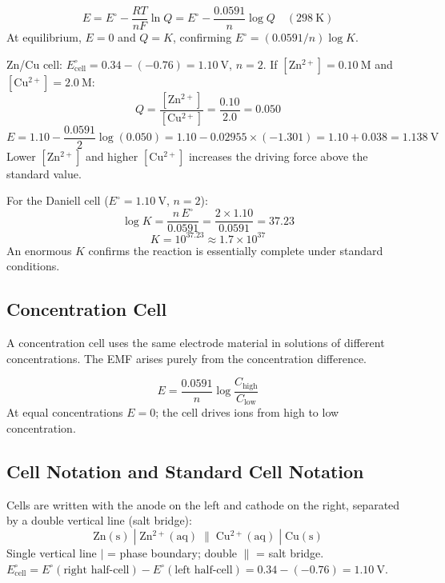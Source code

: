 \documentclass[12pt,a4paper]{article}
\begin{document}
\begin{tcolorbox}[formulabox, title={Nernst Equation}]
\[
E = E^\circ - \frac{RT}{nF}\ln Q = E^\circ - \frac{0.0591}{n}\log Q \quad (298\ \mathrm{K})
\]
At equilibrium, $E = 0$ and $Q = K$, confirming $E^\circ = (0.0591/n)\log K$.
\end{tcolorbox}

\begin{tcolorbox}[examplebox, title={Solved Example: Daniell Cell EMF via Nernst}]
Zn/Cu cell: $E^\circ_{\mathrm{cell}} = 0.34 - (-0.76) = 1.10\ \mathrm{V}$, $n=2$.
If $[\mathrm{Zn^{2+}}] = 0.10\ \mathrm{M}$ and $[\mathrm{Cu^{2+}}] = 2.0\ \mathrm{M}$:
\[
Q = \frac{[\mathrm{Zn^{2+}}]}{[\mathrm{Cu^{2+}}]} = \frac{0.10}{2.0} = 0.050
\]
\[
E = 1.10 - \frac{0.0591}{2}\log(0.050) = 1.10 - 0.02955\times(-1.301) = 1.10 + 0.038 = 1.138\ \mathrm{V}
\]
Lower $[\mathrm{Zn^{2+}}]$ and higher $[\mathrm{Cu^{2+}}]$ increases the driving force above the standard value.
\end{tcolorbox}

\begin{tcolorbox}[examplebox, title={Solved Example: Equilibrium Constant from \texorpdfstring{$E^\circ$}{E0}}]
For the Daniell cell ($E^\circ = 1.10\ \mathrm{V}$, $n=2$):
\[
\log K = \frac{n\,E^\circ}{0.0591} = \frac{2\times1.10}{0.0591} = 37.23
\]
\[
K = 10^{37.23} \approx 1.7\times10^{37}
\]
An enormous $K$ confirms the reaction is essentially complete under standard conditions.
\end{tcolorbox}

\subsection{Concentration Cell}
A concentration cell uses the same electrode material in solutions of different concentrations. The EMF arises purely from the concentration difference.

\begin{tcolorbox}[formulabox, title={Concentration Cell EMF}]
\[
E = \frac{0.0591}{n}\log\frac{C_{\mathrm{high}}}{C_{\mathrm{low}}}
\]
At equal concentrations $E = 0$; the cell drives ions from high to low concentration.
\end{tcolorbox}

\subsection{Cell Notation and Standard Cell Notation}
Cells are written with the anode on the left and cathode on the right, separated by a double vertical line (salt bridge):
\[
\mathrm{Zn(s)}\;|\;\mathrm{Zn^{2+}(aq)}\;\|\;\mathrm{Cu^{2+}(aq)}\;|\;\mathrm{Cu(s)}
\]
Single vertical line $|$ = phase boundary; double $\|$ = salt bridge.\\
$E^\circ_{\mathrm{cell}} = E^\circ(\text{right half-cell}) - E^\circ(\text{left half-cell}) = 0.34 - (-0.76) = 1.10\ \mathrm{V}$.
\end{document}
